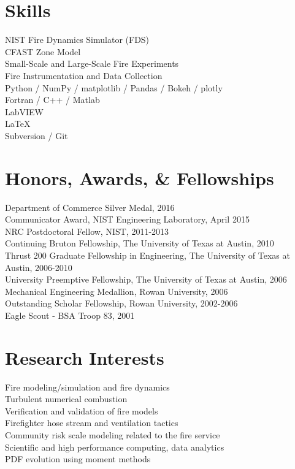 \documentclass[10pt,letterpaper]{article}
\begin{document}

\section*{Skills}
NIST Fire Dynamics Simulator (FDS) \\
CFAST Zone Model \\
Small-Scale and Large-Scale Fire Experiments \\
Fire Instrumentation and Data Collection \\
Python / NumPy / matplotlib / Pandas / Bokeh / plotly \\
Fortran / C++ / Matlab \\
LabVIEW \\
\LaTeX \\
Subversion / Git \\

\section*{Honors, Awards, \& Fellowships}

Department of Commerce Silver Medal, 2016 \\
Communicator Award, NIST Engineering Laboratory, April 2015 \\
NRC Postdoctoral Fellow, NIST, 2011-2013 \\
Continuing Bruton Fellowship, The University of Texas at Austin, 2010 \\
Thrust 200 Graduate Fellowship in Engineering, The University of Texas at Austin, 2006-2010 \\
University Preemptive Fellowship, The University of Texas at Austin, 2006 \\
Mechanical Engineering Medallion, Rowan University, 2006 \\
Outstanding Scholar Fellowship, Rowan University, 2002-2006 \\
Eagle Scout - BSA Troop 83, 2001 \\

\section*{Research Interests}
Fire modeling/simulation and fire dynamics \\
Turbulent numerical combustion \\
Verification and validation of fire models \\
Firefighter hose stream and ventilation tactics \\
Community risk scale modeling related to the fire service \\
Scientific and high performance computing, data analytics \\
PDF evolution using moment methods \\
\end{document}
